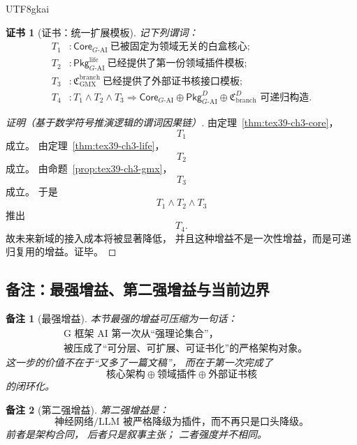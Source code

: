 \documentclass[12pt]{article}
\newtheorem{remark}{备注}[section]
\newtheorem{Certificate}{证书}[section]
\begin{document}
\begin{CJK*}{UTF8}{gkai}
\begin{Certificate}[证书：统一扩展模板]
\label{cert:tex39-ch4-recursive}
记下列谓词：
\[
\begin{aligned}
  T_1 &: \mathsf{Core}_{G\text{-AI}}\ \text{已被固定为领域无关的白盒核心};\\
  T_2 &: \mathsf{Pkg}_{G\text{-AI}}^{\mathrm{life}}\ \text{已经提供了第一份领域插件模板};\\
  T_3 &: \mathfrak C_{\mathrm{GMX}}^{\mathrm{branch}}\ \text{已经提供了外部证书核接口模板};\\
  T_4 &: T_1\wedge T_2\wedge T_3\Rightarrow
  \mathsf{Core}_{G\text{-AI}}
  \oplus
  \mathsf{Pkg}_{G\text{-AI}}^{D}
  \oplus
  \mathfrak C_{\mathrm{branch}}^{D}
  \text{ 可递归构造}.
\end{aligned}
\]
\end{Certificate}

\begin{proof}[证明（基于数学符号推演逻辑的谓词因果链）]
由定理~\ref{thm:tex39-ch3-core}，
\[
  T_1
\]
成立。
由定理~\ref{thm:tex39-ch3-life}，
\[
  T_2
\]
成立。
由命题~\ref{prop:tex39-ch3-gmx}，
\[
  T_3
\]
成立。
于是
\[
  T_1\wedge T_2\wedge T_3
\]
推出
\[
  T_4.
\]
故未来新域的接入成本将被显著降低，
并且这种增益不是一次性增益，而是可递归复用的增益。证毕。
\end{proof}

\subsection{备注：最强增益、第二强增益与当前边界}
\label{subsec:tex39-ch4-remarks}

\begin{remark}[最强增益]
本节最强的增益可压缩为一句话：
\[
  \boxed{
    \begin{aligned}
      &\text{G 框架 AI 第一次从“强理论集合”，}\\
      &\text{被压成了“可分层、可扩展、可证书化”的严格架构对象。}
    \end{aligned}
  }
\]
这一步的价值不在于“又多了一篇文稿”，
而在于第一次完成了
\[
  \text{核心架构}
  \oplus
  \text{领域插件}
  \oplus
  \text{外部证书核}
\]
的闭环化。
\end{remark}

\begin{remark}[第二强增益]
第二强增益是：
\[
  \boxed{
    \text{神经网络/LLM 被严格降级为插件，而不再只是口头降级。}
  }
\]
前者是架构合同，
后者只是叙事主张；
二者强度并不相同。
\end{remark}


\end{CJK*}
\end{document}
